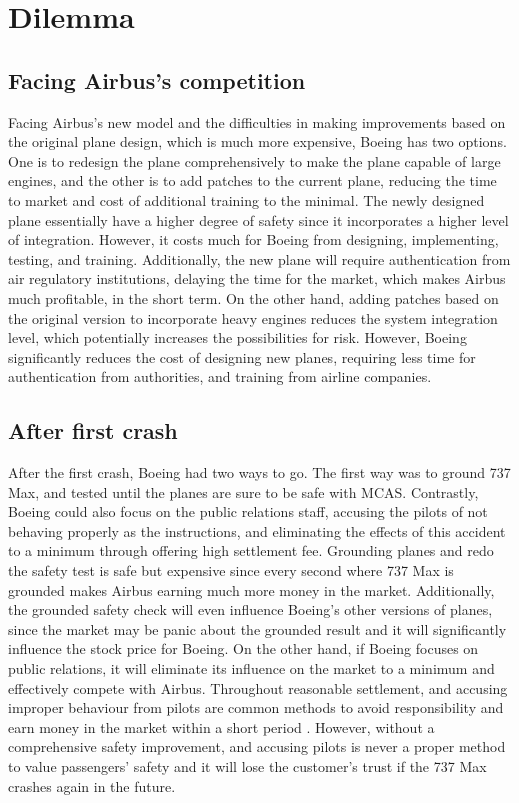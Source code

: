 \documentclass{article}
\begin{document}
 
\section{Dilemma}
\subsection{Facing Airbus's competition}
Facing Airbus's new model and the difficulties in making improvements based on the original plane design, which is much more expensive, Boeing has two options. One is to redesign the plane comprehensively to make the plane capable of large engines, and the other is to add patches to the current plane, reducing the time to market and cost of additional training to the minimal. The newly designed plane essentially have a higher degree of safety since it incorporates a higher level of integration. However, it costs much for Boeing from designing, implementing, testing, and training. Additionally, the new plane will require authentication from air regulatory institutions, delaying the time for the market, which makes Airbus much profitable, in the short term. On the other hand, adding patches based on the original version to incorporate heavy engines reduces the system integration level, which potentially increases the possibilities for risk. However, Boeing significantly reduces the cost of designing new planes, requiring less time for authentication from authorities, and training from airline companies.
\subsection{After first crash}
After the first crash, Boeing had two ways to go. The first way was to ground 737 Max, and tested until the planes are sure to be safe with MCAS. Contrastly, Boeing could also focus on the public relations staff, accusing the pilots of not behaving properly as the instructions, and eliminating the effects of this accident to a minimum through offering high settlement fee. Grounding planes and redo the safety test is safe but expensive since every second where 737 Max is grounded makes Airbus earning much more money in the market. Additionally, the grounded safety check will even influence Boeing's other versions of planes, since the market may be panic about the grounded result and it will significantly influence the stock price for Boeing. On the other hand, if Boeing focuses on public relations, it will eliminate its influence on the market to a minimum and effectively compete with Airbus. Throughout reasonable settlement, and accusing improper behaviour from pilots are common methods to avoid responsibility and earn money in the market within a short period \cite{American37:online}. However, without a comprehensive safety improvement, and accusing pilots is never a proper method to value passengers' safety and it will lose the customer's trust if the 737 Max crashes again in the future.
\end{document}
